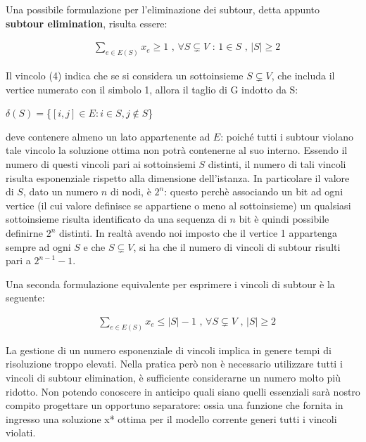 \documentclass[11pt]{article}
\begin{document}
\vspace{2\baselineskip}

Una possibile formulazione per l'eliminazione dei subtour, detta appunto \textbf{subtour elimination}, risulta essere:

\begin{eqnarray}
&\displaystyle{\sum_{e \in E(S)}x_e \geq 1} \text{ , } \forall S \subsetneq V \text{ : } 1 \in S \text{ , } |S| \geq 2
\end{eqnarray}


Il vincolo (4) indica che se si considera un sottoinsieme $S \subsetneq V$, che includa il vertice numerato con il simbolo 1, allora il taglio di G indotto da S:

\begin{center}
$\delta(S) = $\{$ {[i,j]\in E : i \in S, j \notin S} $\} $ $
\end{center}

deve contenere almeno un lato appartenente ad $E$: poich\'e tutti i subtour violano tale vincolo la soluzione ottima non potr\`a contenerne al suo interno.  
Essendo il numero di questi vincoli pari ai sottoinsiemi $S$ distinti, il numero di tali vincoli risulta esponenziale rispetto alla dimensione dell'istanza. In particolare il valore di $S$, dato un numero $n$ di nodi, \`e $2^n$: questo perch\`e associando un bit ad ogni vertice (il cui valore definisce se appartiene o meno al sottoinsieme) un qualsiasi sottoinsieme risulta identificato da una sequenza di $n$ bit è quindi possibile definirne $2^n$ distinti. In realtà avendo noi imposto che il vertice 1 appartenga sempre ad ogni $S$ e che $S \subsetneq V$, si ha che il numero di vincoli di subtour risulti pari a  $2^{n-1} - 1$.

Una seconda formulazione equivalente per esprimere i vincoli di subtour \`e la seguente:

\begin{eqnarray}
&\displaystyle{\sum_{e \in E(S)}x_e \leq |S| - 1} \text{ , } \forall S \subsetneq V \text{ , } |S| \geq 2
\end{eqnarray}

La gestione di un numero esponenziale di vincoli implica in genere tempi di risoluzione troppo elevati. Nella pratica però non è necessario utilizzare tutti i vincoli di subtour elimination, è sufficiente considerarne un numero molto più ridotto. Non potendo conoscere in anticipo quali siano quelli essenziali sarà nostro compito progettare un opportuno separatore: ossia una funzione che fornita in ingresso una soluzione x* ottima per il modello corrente generi tutti i vincoli violati.
\end{document}
